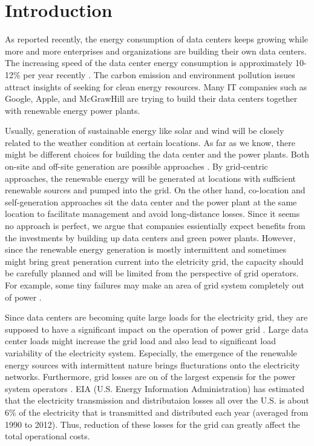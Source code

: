 \section{Introduction}
\label{sec:intro}

As reported recently, the energy consumption of data centers keeps growing while more and more enterprises and organizations are building their own data centers\cite{urgaonkar2011optimal,Koomey2011}. The increasing speed of the data center energy consumption is approximately 10-12\% per year recently \cite{ghatikar2014demand}. The carbon emission and environment pollution issues attract insights of seeking for clean energy resources. Many IT companies such as Google\cite{GoogleGreen}, Apple\cite{Apple13}, and McGrawHill\cite{McGrawHill11} are trying to build their data centers together with renewable energy power plants. 

Usually, generation of sustainable energy like solar and wind will be closely related to the weather condition at certain locations. As far as we know, there might be different choices for building the data center and the power plants. Both on-site and off-site generation are possible approaches \cite {Goiri13}. By grid-centric approaches, the renewable energy will be generated at locations with sufficient renewable sources and pumped into the grid. On the other hand, co-location and self-generation approaches sit the data center and the power plant at the same location to facilitate management and avoid long-distance losses. Since it seems no approach is perfect, we argue that companies essientially expect benefits from the investments by building up data centers and green power plants. However, since the renewable energy generation is mostly intermittent and sometimes might bring great peneration current into the eletricity grid, the capacity should be carefully planned and will be limited from the perspective of grid operators. For example, some tiny failures may make an area of grid system completely out of power \cite{nytimes2014}.

Since data centers are becoming quite large loads for the electricity grid, they are supposed to have a significant impact on the operation of power grid \cite{haowang2014grid}. Large data center loads might increase the grid load and also lead to significant load variability of the electricity system. Especially, the emergence of the renewable energy sources with intermittent nature brings flucturations onto the electricity networks. Furthermore, grid losses are on of the largest expensis for the power system operators \cite{de2014investigation}. EIA (U.S. Energy Information Administration) \cite{EIA} has estimated that the electricity transmission and distributaion losses all over the U.S. is about 6\% of the electricity that is transmitted and distributed each year (averaged from 1990 to 2012). Thus, reduction of these losses for the grid can greatly affect the total operational costs.

